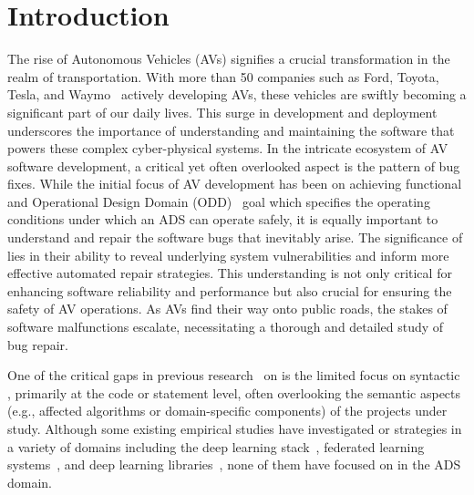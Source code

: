 \section{Introduction}\label{sec:introduction}

The rise of Autonomous Vehicles (AVs) signifies a crucial transformation in the realm of transportation. With more than 50 companies such as Ford, Toyota, Tesla, and Waymo~\cite{waymo,av_ford,av_intel,40_plus_corporations,18_av_companies,tesla_sold_2_million_cars,toyota_av,gm-av_charging} actively developing AVs, these vehicles are swiftly becoming a significant part of our daily lives.
This surge in development and deployment underscores the importance of understanding and maintaining the software that powers these complex cyber-physical systems. 
In the intricate ecosystem of AV software development, a critical yet often overlooked aspect is the pattern of bug fixes. While the initial focus of AV development has been on achieving functional and Operational Design Domain (ODD)~\cite{czarnecki2018operational} goal which specifies the operating conditions under which an ADS can operate safely, it is equally important to understand and repair the software bugs that inevitably arise. 
The significance of \bfps lies in their ability to reveal underlying system vulnerabilities and inform more effective automated repair strategies. This understanding is not only critical for enhancing software reliability and performance but also crucial for ensuring the safety of AV operations. As AVs find their way onto public roads, the stakes of software malfunctions escalate, necessitating a thorough and detailed study of bug repair.

One of the critical gaps in previous research~\cite{PanKW09,ZhongS15,SotoTWGL16,CamposM17,IslamZ20} on \bfps is the limited focus on syntactic \bfps, primarily at the code or statement level, often overlooking the semantic aspects (e.g., affected algorithms or domain-specific components) of the projects under study.
Although some existing empirical studies have investigated \bfps or strategies in a variety of domains including the deep learning stack~\cite{Huang0WCM023}, federated learning systems~\cite{DuCC0C023}, and deep learning libraries~\cite{IslamPNR20}, none of them have focused on \bfps in the ADS domain.

